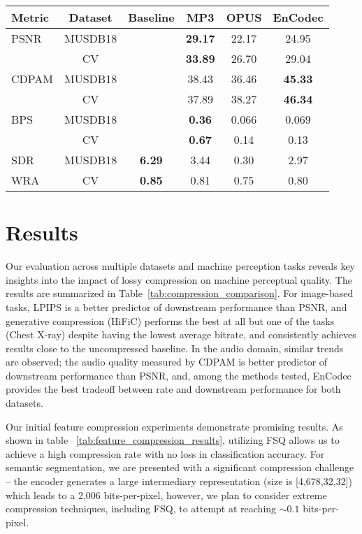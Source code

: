 \documentclass[10pt,twocolumn,letterpaper]{article}
\begin{document}
\begin{table*}[!htb]
\begin{subtable}{.4\linewidth}
{\begin{tabular}{lccccc}
        \toprule
        Metric & Dataset & Baseline & MP3 & OPUS & EnCodec \\
        \midrule
        PSNR & MUSDB18 &  &\textbf{ 29.17} & 22.17 & 24.95 \\
             & CV &  & \textbf{33.89} & 26.70 & 29.04 \\
        \midrule
        CDPAM & MUSDB18 &  & 38.43 & 36.46 & \textbf{45.33} \\
              & CV &  & 37.89 & 38.27 & \textbf{46.34} \\
        \midrule
        BPS & MUSDB18 &  & \textbf{0.36} & 0.066 & 0.069 \\
            & CV &  & \textbf{0.67} & 0.14 & 0.13 \\
        \midrule
        SDR & MUSDB18 & \textbf{6.29} & 3.44 & 0.30 & 2.97 \\
        \midrule
        WRA & CV & \textbf{0.85} & 0.81 & 0.75 & 0.80 \\
        \bottomrule
        \end{tabular}}
    \end{subtable}%
\end{table*}


\section{Results}

Our evaluation across multiple datasets and machine perception tasks reveals key insights into the impact of lossy compression on machine perceptual quality. The results are summarized in Table~\ref{tab:compression_comparison}.
For image-based tasks, LPIPS is a better predictor of downstream performance than PSNR, and generative compression (HiFiC) performs the best at all but one of the tasks (Chest X-ray) despite having the lowest average bitrate, and consistently achieves results close to the uncompressed baseline.
In the audio domain, similar trends are observed; the audio quality measured by CDPAM is better predictor of downstream performance than PSNR, and, among the methods tested, EnCodec provides the best tradeoff between rate and downstream performance for both datasets.

Our initial feature compression experiments demonstrate promising results. As shown in table ~\ref{tab:feature_compression_results}, utilizing FSQ allows us to achieve a high compression rate with no loss in classification accuracy. For semantic segmentation, we are presented with a significant compression challenge -- the encoder generates a large intermediary representation (size is [4,678,32,32]) which leads to a 2,006 bits-per-pixel, however, we plan to consider extreme compression techniques, including FSQ, to attempt at reaching $\sim 0.1$ bits-per-pixel.
\end{document}
